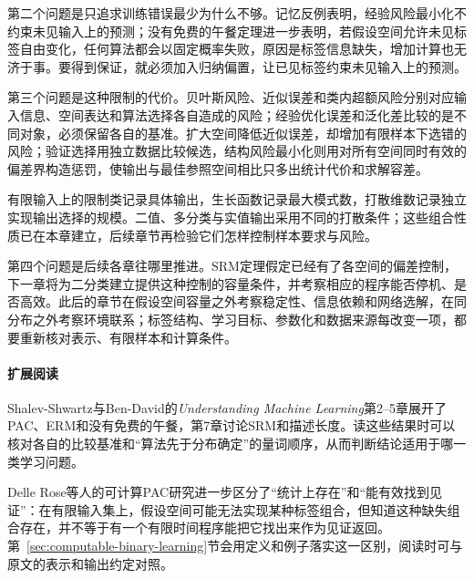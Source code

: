 第二个问题是只追求训练错误最少为什么不够。记忆反例表明，经验风险最小化不约束未见输入上的预测；没有免费的午餐定理进一步表明，若假设空间允许未见标签自由变化，任何算法都会以固定概率失败，原因是标签信息缺失，增加计算也无济于事。要得到保证，就必须加入归纳偏置，让已见标签约束未见输入上的预测。

第三个问题是这种限制的代价。贝叶斯风险、近似误差和类内超额风险分别对应输入信息、空间表达和算法选择各自造成的风险；经验优化误差和泛化差比较的是不同对象，必须保留各自的基准。扩大空间降低近似误差，却增加有限样本下选错的风险；验证选择用独立数据比较候选，结构风险最小化则用对所有空间同时有效的偏差界构造惩罚，使输出与最佳参照空间相比只多出统计代价和求解容差。

有限输入上的限制类记录具体输出，生长函数记录最大模式数，打散维数记录独立实现输出选择的规模。二值、多分类与实值输出采用不同的打散条件；这些组合性质已在本章建立，后续章节再检验它们怎样控制样本要求与风险。

第四个问题是后续各章往哪里推进。SRM定理假定已经有了各空间的偏差控制，下一章将为二分类建立提供这种控制的容量条件，并考察相应的程序能否停机、是否高效。此后的章节在假设空间容量之外考察稳定性、信息依赖和网络选解，在同分布之外考察环境联系；标签结构、学习目标、参数化和数据来源每改变一项，都要重新核对表示、有限样本和计算条件。

\paragraph{扩展阅读}
Shalev-Shwartz与Ben-David的\textit{Understanding Machine Learning}第2--5章展开了PAC、ERM和没有免费的午餐，第7章讨论SRM和描述长度。读这些结果时可以核对各自的比较基准和“算法先于分布确定”的量词顺序，从而判断结论适用于哪一类学习问题。

Delle Rose等人的可计算PAC研究进一步区分了“统计上存在”和“能有效找到见证”：在有限输入集上，假设空间可能无法实现某种标签组合，但知道这种缺失组合存在，并不等于有一个有限时间程序能把它找出来作为见证返回。第~\ref{sec:computable-binary-learning}节会用定义和例子落实这一区别，阅读时可与原文的表示和输出约定对照。
